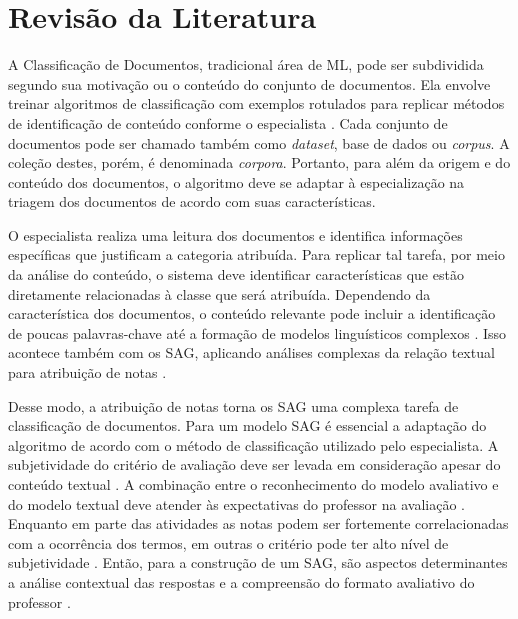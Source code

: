 \chapter{Revisão da Literatura}
\label{cap-literatura}


A Classificação de Documentos, tradicional área de ML, pode ser subdividida segundo sua motivação ou o conteúdo do conjunto de documentos. Ela envolve treinar algoritmos de classificação com exemplos rotulados para replicar métodos de identificação de conteúdo conforme o especialista \cite{baeza2011}. Cada conjunto de documentos pode ser chamado também como \textit{dataset}, base de dados ou \textit{corpus}. A coleção destes, porém, é denominada \textit{corpora}. Portanto, para além da origem e do conteúdo dos documentos, o algoritmo deve se adaptar à especialização na triagem dos documentos de acordo com suas características.

O especialista realiza uma leitura dos documentos e identifica informações específicas que justificam a categoria atribuída. Para replicar tal tarefa, por meio da análise do conteúdo, o sistema deve identificar características que estão diretamente relacionadas à classe que será atribuída. Dependendo da característica dos documentos, o conteúdo relevante pode incluir a identificação de poucas palavras-chave até a formação de modelos linguísticos complexos \cite{jurafsky2009}. Isso acontece também com os SAG, aplicando análises complexas da relação textual para atribuição de notas \cite{paiva2012, yang2021}.

Desse modo, a atribuição de notas torna os SAG uma complexa tarefa de classificação de documentos. Para um modelo SAG é essencial a adaptação do algoritmo de acordo com o método de classificação utilizado pelo especialista. A subjetividade do critério de avaliação deve ser levada em consideração apesar do conteúdo textual \cite{pado2021}. A combinação entre o reconhecimento do modelo avaliativo e do modelo textual deve atender às expectativas do professor na avaliação \cite{condor2020}. Enquanto em parte das atividades as notas podem ser fortemente correlacionadas com a ocorrência dos termos, em outras o critério pode ter alto nível de subjetividade \cite{azad2020}. Então, para a construção de um SAG, são aspectos determinantes a análise contextual das respostas e a compreensão do formato avaliativo do professor \cite{mohler2011}.

